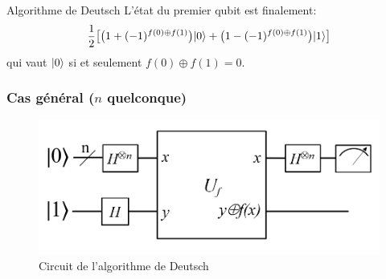 \documentclass[aspectratio=169]{beamer}
\theoremstyle{plain}
\theoremstyle{definition}
\DeclarePairedDelimiter\ket{\lvert}{\rangle}
\begin{document}
\begin{frame}{Algorithme de Deutsch}
    L'état du premier qubit est finalement:
    \begin{equation*}
        \frac{1}{2} \big[ \big(1+(-1)^{f(0)\oplus f(1)}\big)\ket{0} + \big(1-(-1)^{f(0)\oplus f(1)}\big)\ket{1} \big]
    \end{equation*}
    qui vaut $\ket{0}$ si et seulement $f(0)\oplus f(1) = 0$.
\end{frame}

\begin{frame}
    \frametitle{Cas général ($n$ quelconque)}
    \begin{figure}[!ht]
        \centering
        \includegraphics[scale=0.5]{deutsch-circuit-n.png}
        \caption{Circuit de l'algorithme de Deutsch}
    \end{figure}
\end{frame}
\end{document}
